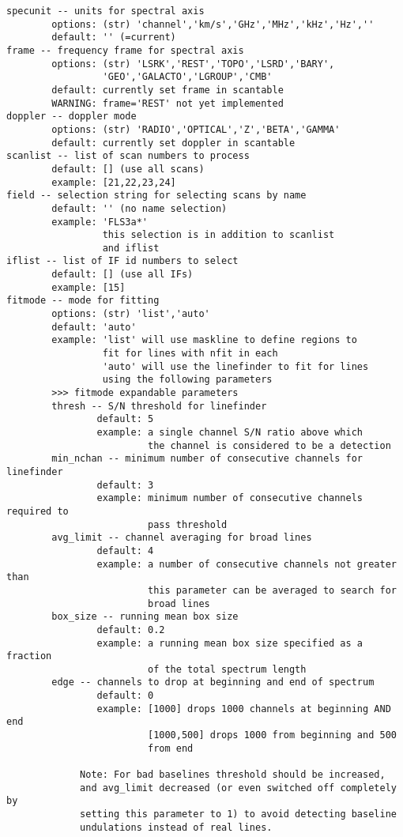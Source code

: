 \begin{verbatim}
specunit -- units for spectral axis
        options: (str) 'channel','km/s','GHz','MHz','kHz','Hz',''
        default: '' (=current)
frame -- frequency frame for spectral axis
        options: (str) 'LSRK','REST','TOPO','LSRD','BARY',
                 'GEO','GALACTO','LGROUP','CMB'
        default: currently set frame in scantable
        WARNING: frame='REST' not yet implemented
doppler -- doppler mode
        options: (str) 'RADIO','OPTICAL','Z','BETA','GAMMA'
        default: currently set doppler in scantable
scanlist -- list of scan numbers to process
        default: [] (use all scans)
        example: [21,22,23,24]
field -- selection string for selecting scans by name
        default: '' (no name selection)
        example: 'FLS3a*'
                 this selection is in addition to scanlist
                 and iflist
iflist -- list of IF id numbers to select
        default: [] (use all IFs)
        example: [15]
fitmode -- mode for fitting
        options: (str) 'list','auto'
        default: 'auto'
        example: 'list' will use maskline to define regions to
                 fit for lines with nfit in each
                 'auto' will use the linefinder to fit for lines
                 using the following parameters
        >>> fitmode expandable parameters
        thresh -- S/N threshold for linefinder
                default: 5
                example: a single channel S/N ratio above which 
                         the channel is considered to be a detection
        min_nchan -- minimum number of consecutive channels for linefinder
                default: 3
                example: minimum number of consecutive channels required to 
                         pass threshold
        avg_limit -- channel averaging for broad lines
                default: 4
                example: a number of consecutive channels not greater than
                         this parameter can be averaged to search for 
                         broad lines
        box_size -- running mean box size
                default: 0.2
                example: a running mean box size specified as a fraction
                         of the total spectrum length
        edge -- channels to drop at beginning and end of spectrum
                default: 0
                example: [1000] drops 1000 channels at beginning AND end
                         [1000,500] drops 1000 from beginning and 500 
                         from end

             Note: For bad baselines threshold should be increased,
             and avg_limit decreased (or even switched off completely by
             setting this parameter to 1) to avoid detecting baseline
             undulations instead of real lines.


\end{verbatim}
